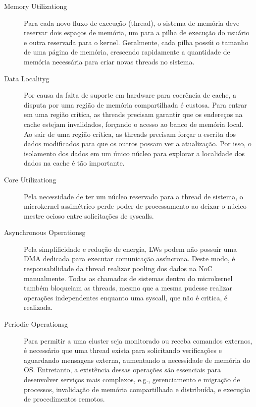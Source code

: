 	\begin{description}

		\item[Memory Utilizationg] Para cada novo fluxo de execução (thread),
			o sistema de memória deve reservar dois espaços de memória, um
			para a pilha de execução do usuário e outra reservada para
			o kernel. Geralmente, cada pilha possúi o tamanho de uma página de
			memória, crescendo rapidamente a quantidade de memória necessária
			para criar novas threads no sistema.

		\item[Data Localityg] Por causa da falta de suporte em hardware para
			coerência de cache, a disputa por uma região de memória
			compartilhada é custosa. Para entrar em uma região crítica, as
			threads precisam garantir que os endereços na cache estejam
			invalidados, forçando o acesso ao banco de memória local. Ao sair
			de uma região crítica, as threads precisam forçar a escrita dos
			dados modificados para que os outros possam ver a atualização.
			Por isso, o isolamento dos dados em um único núcleo para explorar
			a localidade dos dados na cache é tão importante.

		\item[Core Utilizationg] Pela necessidade de ter um núcleo reservado
			para a thread de sistema, o microkernel assimétrico perde poder
			de processamento ao deixar o núcleo mestre ocioso entre
			solicitações de syscalls.

		\item[Asynchronous Operationsg] Pela simplificidade e redução de
			energia, LWs podem não possuir uma DMA dedicada para executar
			comunicação assíncrona. Deste modo, é responsabilidade da thread
			realizar pooling dos dados na NoC manualmente. Todas as chamadas de
			sistemas dentro do microkernel também bloqueiam as threads, mesmo que
			a mesma pudesse realizar operações independentes enquanto uma syscall,
			que não é critica, é realizada.

		\item[Periodic Operationsg] Para permitir a uma cluster seja monitorado
			ou receba comandos externos, é necessário que uma thread exista para
			solicitando verificações e aguardando mensagens externa, aumentando
			a necessidade de memória do OS. Entretanto, a existência dessas
			operações são essenciais para desenvolver serviços mais complexos,
			e.g., gerenciamento e migração de processos, invalidação de memória
			compartilhada e distribuída, e execução de procedimentos remotos.

	\end{description}

